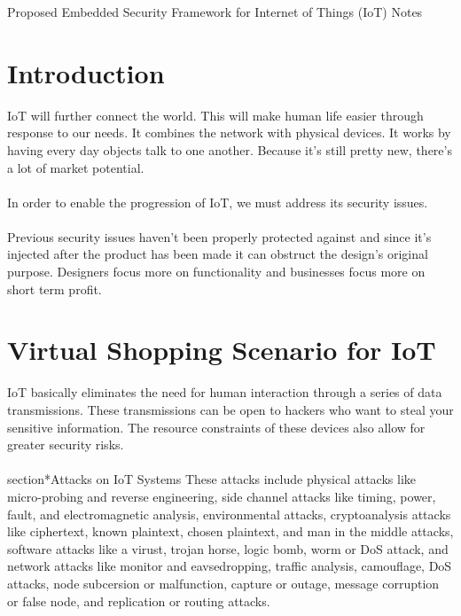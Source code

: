\documentclass{article}
\begin{document}
\begin{center}
\LARGE Proposed Embedded Security Framework for Internet of Things (IoT) Notes
\end{center}

\section*{Introduction}
IoT will further connect the world. This will make human life easier through response to our needs. It combines the network with physical devices. It works by having every day objects talk to one another. Because it's still pretty new, there's a lot of market potential.
\\
\\ In order to enable the progression of IoT, we must address its security issues.
\\
\\ Previous security issues haven't been properly protected against and since it's injected after the product has been made it can obstruct the design's original purpose. Designers focus more on functionality and businesses focus more on short term profit.

\section*{Virtual Shopping Scenario for IoT}
IoT basically eliminates the need for human interaction through a series of data transmissions. These transmissions can be open to hackers who want to steal your sensitive information. The resource constraints of these devices also allow for greater security risks. 
\\
\\ section*{Attacks on IoT Systems}
These attacks include physical attacks like micro-probing and reverse engineering, side channel attacks like timing, power, fault, and electromagnetic analysis, environmental attacks, cryptoanalysis attacks like ciphertext, known plaintext, chosen plaintext, and man in the middle attacks, software attacks like a virust, trojan horse, logic bomb, worm or DoS attack, and network attacks like monitor and eavsedropping, traffic analysis, camouflage, DoS attacks, node subcersion or malfunction, capture or outage, message corruption or false node, and replication or routing attacks.
\end{document}
